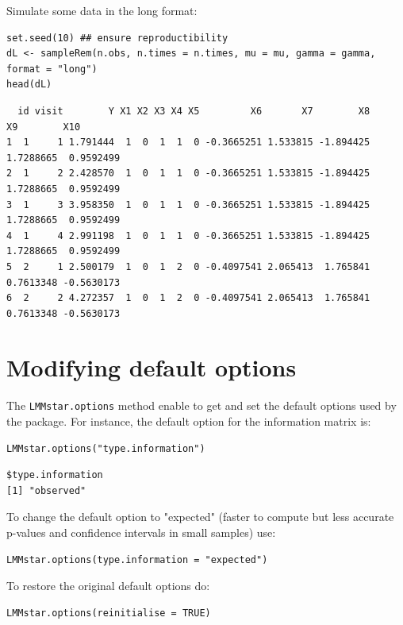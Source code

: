 \documentclass[12pt]{article}
\begin{document}
Simulate some data in the long format:
\lstset{language=r,label= ,caption= ,captionpos=b,numbers=none}
\begin{lstlisting}
set.seed(10) ## ensure reproductibility
dL <- sampleRem(n.obs, n.times = n.times, mu = mu, gamma = gamma, format = "long")
head(dL)
\end{lstlisting}

\begin{verbatim}
  id visit        Y X1 X2 X3 X4 X5         X6       X7        X8        X9        X10
1  1     1 1.791444  1  0  1  1  0 -0.3665251 1.533815 -1.894425 1.7288665  0.9592499
2  1     2 2.428570  1  0  1  1  0 -0.3665251 1.533815 -1.894425 1.7288665  0.9592499
3  1     3 3.958350  1  0  1  1  0 -0.3665251 1.533815 -1.894425 1.7288665  0.9592499
4  1     4 2.991198  1  0  1  1  0 -0.3665251 1.533815 -1.894425 1.7288665  0.9592499
5  2     1 2.500179  1  0  1  2  0 -0.4097541 2.065413  1.765841 0.7613348 -0.5630173
6  2     2 4.272357  1  0  1  2  0 -0.4097541 2.065413  1.765841 0.7613348 -0.5630173
\end{verbatim}


\clearpage

\section{Modifying default options}
\label{sec:org2ff7547}
The \texttt{LMMstar.options} method enable to get and set the default options
used by the package. For instance, the default option for the information matrix is:
\lstset{language=r,label= ,caption= ,captionpos=b,numbers=none}
\begin{lstlisting}
LMMstar.options("type.information")
\end{lstlisting}

\begin{verbatim}
$type.information
[1] "observed"
\end{verbatim}


To change the default option to "expected" (faster to compute but less accurate p-values and confidence intervals in small samples) use:
\lstset{language=r,label= ,caption= ,captionpos=b,numbers=none}
\begin{lstlisting}
LMMstar.options(type.information = "expected")
\end{lstlisting}

To restore the original default options do:
\lstset{language=r,label= ,caption= ,captionpos=b,numbers=none}
\begin{lstlisting}
LMMstar.options(reinitialise = TRUE)
\end{lstlisting}
\end{document}
